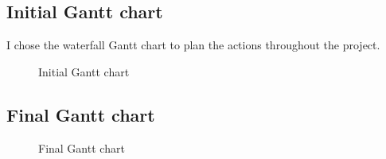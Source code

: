 \documentclass[../documentation.tex]{subfiles}
\begin{document}
\thispagestyle{empty} %

\subsection{Initial Gantt chart}

I chose the waterfall Gantt chart to plan the actions
throughout the project.

\begin{figure}[h]
    \centering
    \caption{Initial Gantt chart}
\end{figure}

\pagebreak
            
\subsection{Final Gantt chart}

\begin{figure}[h]
    \centering
    \caption{Final Gantt chart}
\end{figure}
\end{document}
